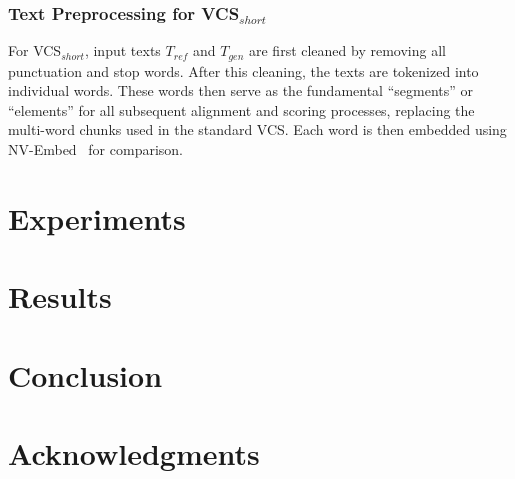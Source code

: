 \documentclass[letterpaper]{article} %
\begin{document}
\subsubsection{Text Preprocessing for VCS$_{short}$}
For VCS$_{short}$, input texts $T_{ref}$ and $T_{gen}$ are first cleaned by removing all punctuation and stop words. After this cleaning, the texts are tokenized into individual words. These words then serve as the fundamental ``segments'' or ``elements'' for all subsequent alignment and scoring processes, replacing the multi-word chunks used in the standard VCS. Each word is then embedded using NV-Embed~\cite{lee2024nv} for comparison.


\section{Experiments}

\section{Results}

\section{Conclusion}

\section*{Acknowledgments}


\end{document}
